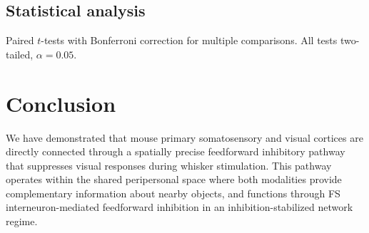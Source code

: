 \documentclass[11pt]{article}
\begin{document}
\subsection{Statistical analysis}
Paired $t$-tests with Bonferroni correction for multiple comparisons. All tests two-tailed, $\alpha = 0.05$.

\section{Conclusion}

We have demonstrated that mouse primary somatosensory and visual cortices are directly connected through a spatially precise feedforward inhibitory pathway that suppresses visual responses during whisker stimulation. This pathway operates within the shared peripersonal space where both modalities provide complementary information about nearby objects, and functions through FS interneuron-mediated feedforward inhibition in an inhibition-stabilized network regime.



\end{document}
